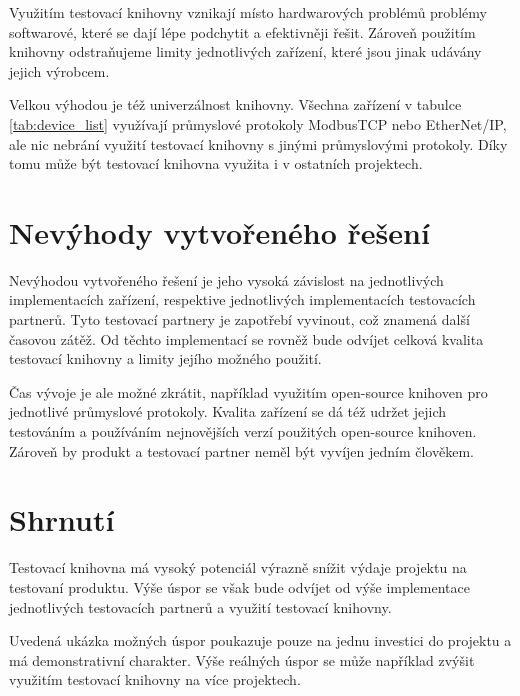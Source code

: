 Využitím testovací knihovny vznikají místo hardwarových problémů problémy softwarové, které se dají lépe podchytit a efektivněji řešit. Zároveň použitím knihovny odstraňujeme limity jednotlivých zařízení, které jsou jinak udávány jejich výrobcem.

Velkou výhodou je též univerzálnost knihovny. Všechna zařízení v tabulce \ref{tab:device_list} využívají průmyslové protokoly ModbusTCP nebo EtherNet/IP, ale nic nebrání využití testovací knihovny s jinými průmyslovými protokoly. Díky tomu může být testovací knihovna využita i v ostatních projektech. 

\section{Nevýhody vytvořeného řešení}
Nevýhodou vytvořeného řešení je jeho vysoká závislost na jednotlivých implementacích zařízení, respektive jednotlivých implementacích testovacích partnerů. Tyto testovací partnery je zapotřebí vyvinout, což znamená další časovou zátěž. Od těchto implementací se rovněž bude odvíjet celková kvalita testovací knihovny a limity jejího možného použití.

Čas vývoje je ale možné zkrátit, například využitím open-source knihoven pro jednotlivé průmyslové protokoly. Kvalita zařízení se dá též udržet jejich testováním a používáním nejnovějších verzí použitých open-source knihoven. Zároveň by produkt a testovací partner neměl být vyvíjen jedním člověkem.


\section{Shrnutí}
Testovací knihovna má vysoký potenciál výrazně snížit výdaje projektu na testovaní produktu. 
Výše úspor se však bude odvíjet od výše implementace jednotlivých testovacích partnerů a využití testovací knihovny.

Uvedená ukázka možných úspor poukazuje pouze na jednu investici do projektu a má demonstrativní charakter. Výše reálných úspor se může například zvýšit využitím testovací knihovny na více projektech.


